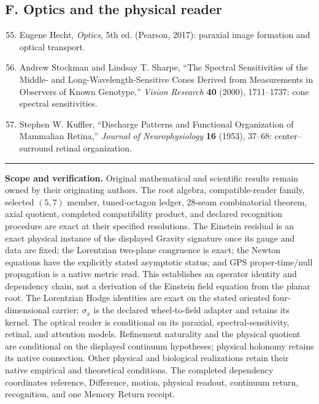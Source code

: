 \documentclass[10pt]{article}
\begin{document}
\subsection*{F. Optics and the physical reader}
\begin{enumerate}[itemsep=1pt,topsep=3pt]\setcounter{enumi}{54}
\item Eugene Hecht, \emph{Optics}, 5th ed. (Pearson, 2017): paraxial image formation and optical transport.
\item Andrew Stockman and Lindsay T. Sharpe, ``The Spectral Sensitivities of the Middle- and Long-Wavelength-Sensitive Cones Derived from Measurements in Observers of Known Genotype,'' \emph{Vision Research} \textbf{40} (2000), 1711--1737: cone spectral sensitivities.
\item Stephen W. Kuffler, ``Discharge Patterns and Functional Organization of Mammalian Retina,'' \emph{Journal of Neurophysiology} \textbf{16} (1953), 37--68: center--surround retinal organization.
\end{enumerate}
\vspace{0.1in}\hrule\vspace{0.1in}
\textbf{Scope and verification.} Original mathematical and scientific results remain owned by their originating authors. The root algebra, compatible-reader family, selected $(5,7)$ member, tuned-octagon ledger, 28-seam combinatorial theorem, axial quotient, completed compatibility product, and declared recognition procedure are exact at their specified resolutions. The Einstein residual is an exact physical instance of the displayed Gravity signature once its gauge and data are fixed; the Lorentzian two-plane congruence is exact; the Newton equations have the explicitly stated asymptotic status; and GPS proper-time/null propagation is a native metric read. This establishes an operator identity and dependency chain, not a derivation of the Einstein field equation from the planar root. The Lorentzian Hodge identities are exact on the stated oriented four-dimensional carrier; $\sigma_x$ is the declared wheel-to-field adapter and retains its kernel. The optical reader is conditional on its paraxial, spectral-sensitivity, retinal, and attention models. Refinement naturality and the physical quotient are conditional on the displayed continuum hypotheses; physical holonomy retains its native connection. Other physical and biological realizations retain their native empirical and theoretical conditions. The completed dependency coordinates reference, Difference, motion, physical readout, continuum return, recognition, and one Memory Return receipt.
\normalsize
\end{document}
